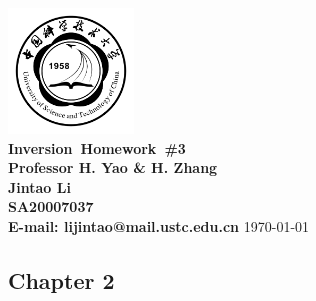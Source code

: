 \documentclass{article}
\makeatletter
\newcommand{\hmwkTitle}{Homework\ \#3}
\newcommand{\hmwkClass}{Inversion}
\newcommand{\hmwkClassInstructor}{Professor H. Yao \& H. Zhang}
\newcommand{\hmwkAuthorName}{\textbf{Jintao Li}}
\newcommand{\hmwkAuthorID}{\textbf{SA20007037}}
\newcommand{\hmwkAuthoremail}{\textbf{E-mail: lijintao@mail.ustc.edu.cn}}
\makeatother
\begin{document}
\begin{titlepage}

\begin{center}

\textcolor{ustcblue}{\includegraphics[width=0.25\textwidth]{./ustc_logo_fig.pdf} \\ [1cm]}
{ \Huge \bfseries \hmwkClass\ \hmwkTitle}\\[1cm]

\large \textbf{\hmwkClassInstructor} \\ [5cm]

\large \hmwkAuthorName \\ [0.25cm]
\large \hmwkAuthorID \\ [0.25cm]
\large \hmwkAuthoremail
\vfill
{\large \today}

\end{center}

\end{titlepage}

\begin{center}
\section{Chapter 2}
\end{center}
\end{document}

